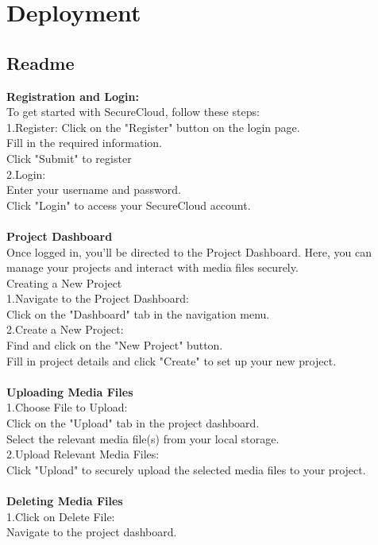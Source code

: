 \chapter{Deployment}
\section{Readme}
\textbf{Registration and Login:}\\
To get started with SecureCloud, follow these steps:\\
1.Register:
Click on the "Register" button on the login page.\\
Fill in the required information.\\
Click "Submit" to register\\
2.Login:\\
Enter your username and password.\\
Click "Login" to access your SecureCloud account.
\\
\\
\textbf{Project Dashboard}\\
Once logged in, you'll be directed to the Project Dashboard. Here, you can manage your projects and
interact with media files securely.\\
Creating a New Project\\
1.Navigate to the Project Dashboard:\\
Click on the "Dashboard" tab in the navigation menu.\\
2.Create a New Project:\\
Find and click on the "New Project" button.\\
Fill in project details and click "Create" to set up your new project. 
\\
\\
\textbf{Uploading Media Files }\\
1.Choose File to Upload:\\
Click on the "Upload" tab in the project dashboard.\\
Select the relevant media file(s) from your local storage.\\
2.Upload Relevant Media Files:\\
Click "Upload" to securely upload the selected media files to your project. 
\\
\\
\textbf{Deleting Media Files }\\
1.Click on Delete File:\\
Navigate to the project dashboard.\\
